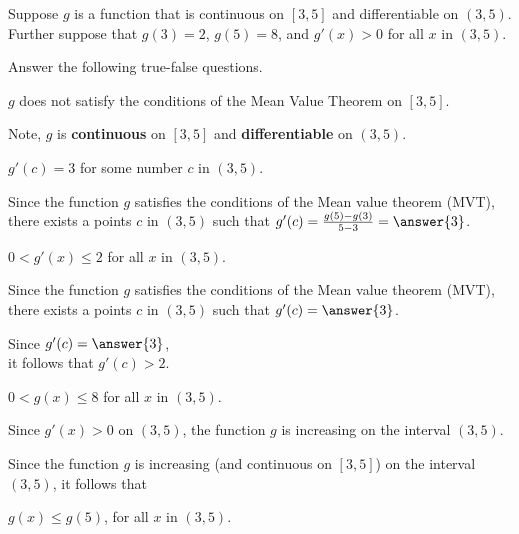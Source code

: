 \documentclass{ximera}
\author{Nela Lakos \and Kyle Parsons}
\begin{document}
\begin{exercise}

Suppose $g$ is a function that is continuous on $[3,5]$ and differentiable on $(3,5)$.  Further suppose that $g(3)=2$, $g(5)=8$, and $g'(x)>0$ for all $x$ in $(3,5)$.

Answer the following true-false questions.

$g$ does not satisfy the conditions of the Mean Value Theorem on $[3,5]$.
\begin{hint}
Note, $g$ is \textbf{continuous}  on $[3,5]$ and \textbf{differentiable} on $(3,5)$.
\end{hint}
\begin{multipleChoice}
\end{multipleChoice}

$g'(c)=3$ for some number $c$ in $(3,5)$.
\begin{hint}
Since the function $g$ satisfies the conditions of the Mean value theorem (MVT), there exists a points $c$ in $(3,5)$ such that $g'(c)=\frac{g(5)-g(3)}{5-3}=\answer{3}$.
\end{hint}
\begin{multipleChoice}
\end{multipleChoice}


$0<g'(x)\leq2$ for all $x$ in $(3,5)$.
\begin{hint}
Since the function $g$ satisfies the conditions of the Mean value theorem (MVT), there exists a points $c$ in $(3,5)$ such that $g'(c)=\answer{3}$.
\end{hint}
\begin{hint}
Since  $g'(c)=\answer{3}$,\\
 it follows that $g'(c)>2$.
\end{hint}
\begin{multipleChoice}
\end{multipleChoice}

$0<g(x)\leq 8$ for all $x$ in $(3,5)$.
\begin{hint}
Since $g'(x)>0$ on $(3,5)$, the function $g$ is increasing on the interval $(3,5)$. 
\end{hint}
\begin{hint}
Since  the function $g$ is increasing (and continuous on $[3,5]$) on the interval $(3,5)$, it follows that

 $g(x)\le g(5)$, for all $x$ in $(3,5)$.
\end{hint}
\begin{multipleChoice}
\end{multipleChoice}



\end{exercise}
\end{document}
